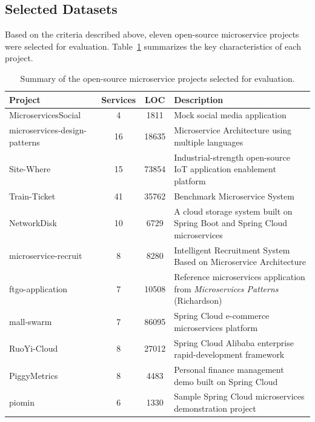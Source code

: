 \subsection{Selected Datasets}
\label{subsec:selected-datasets}

\par Based on the criteria described above, eleven open-source microservice projects were selected for evaluation. Table~\ref{tab:datasets} summarizes the key characteristics of each project.

\begin{table}[htbp]
    \centering
    \footnotesize
    \begin{tabular}{|l|c|c|p{5cm}|}
        \hline
        \textbf{Project} & \textbf{Services} & \textbf{LOC} & \textbf{Description} \\
        \hline\hline
        MicroservicesSocial & 4 & 1811 & Mock social media application \\
        \hline
        microservices-design-patterns & 16 & 18635 & Microservice Architecture using multiple languages \\
        \hline
        Site-Where & 15 & 73854 & Industrial-strength open-source IoT application enablement platform \\
        \hline
        Train-Ticket & 41 & 35762 &  Benchmark Microservice System \\
        \hline
        \hline
        NetworkDisk & 10 & 6729 & A cloud storage system built on Spring Boot and Spring Cloud microservices \\
        \hline
        \hline
        microservice-recruit & 8 & 8280 & Intelligent Recruitment System Based on Microservice Architecture \\
        \hline
        ftgo-application & 7 & 10508 & Reference microservices application from \textit{Microservices Patterns} (Richardson) \\
        \hline
        mall-swarm & 7 & 86095 & Spring Cloud e-commerce microservices platform \\
        \hline
        RuoYi-Cloud & 8 & 27012 & Spring Cloud Alibaba enterprise rapid-development framework \\
        \hline
        PiggyMetrics & 8 & 4483 & Personal finance management demo built on Spring Cloud \\
        \hline
        piomin & 6 & 1330 & Sample Spring Cloud microservices demonstration project \\
        \hline
    \end{tabular}
    \caption{Summary of the open-source microservice projects selected for evaluation.}
    \label{tab:datasets}
\end{table}

